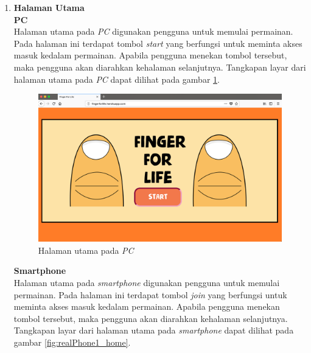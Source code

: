 \begin{enumerate}
	\item \textbf{Halaman Utama} \\
	\textbf{PC} \\
	Halaman utama pada \textit{PC} digunakan pengguna untuk memulai permainan. Pada halaman ini terdapat tombol \textit{start} yang berfungsi untuk meminta akses masuk kedalam permainan. Apabila pengguna menekan tombol tersebut, maka pengguna akan diarahkan kehalaman selanjutnya. Tangkapan layar dari halaman utama pada \textit{PC} dapat dilihat pada gambar \ref{fig:realWeb1_home}.
	
\begin{figure}[H]
	\centering
	\includegraphics[scale=0.25]{Gambar/realWeb1_home}
	\caption{Halaman utama pada \textit{PC}}
	\label{fig:realWeb1_home}
\end{figure}

	\textbf{Smartphone} \\
	Halaman utama pada \textit{smartphone} digunakan pengguna untuk memulai permainan. Pada halaman ini terdapat tombol \textit{join} yang berfungsi untuk meminta akses masuk kedalam permainan. Apabila pengguna menekan tombol tersebut, maka pengguna akan diarahkan kehalaman selanjutnya. Tangkapan layar dari halaman utama pada \textit{smartphone} dapat dilihat pada gambar \ref{fig:realPhone1_home}.
	

\end{enumerate}
